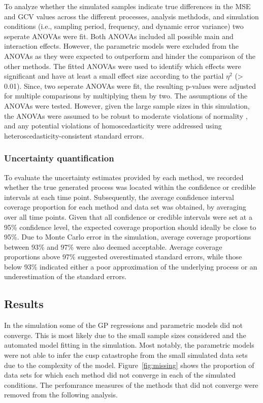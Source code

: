 \documentclass[man, floatsintext]{apa7}
\begin{document}
To analyze whether the simulated samples indicate true differences in the
MSE and GCV values across the different processes, analysis methdods, and
simulation conditions (i.e., sampling period, frequency, and dynamic error
variance) two seperate ANOVAs were fit. Both ANOVAs included all possible main
and interaction effects. However, the parametric models were excluded from
the ANOVAs as they were expected to outperform and hinder the comparison
of the other methods. The fitted ANOVAs were used to identify which effects
were significant and have at least a small effect size according to the partial
$\eta^2$ (> 0.01). Since, two seperate ANOVAs were fit, the resulting p-values
were adjusted for multiple comparisons by multiplying them by two. The
assumptions of the ANOVAs were tested. However, given the large sample sizes in
this simulation, the ANOVAs were assumed to be robust to moderate violations of
normality \parencite{blanca_non-normal_2017}, and any potential violations of
homoscedasticity were addressed using heteroscedasticity-consistent standard
errors.

\subsubsection{Uncertainty quantification}

To evaluate the uncertainty estimates provided by each method, we recorded
whether the true generated process was located within the confidence or
credible intervals at each time point. Subsequently, the average confidence
interval coverage proportion for each method and data set was obtained, by
averaging over all time points. Given that all confidence or credible intervals
were set at a 95\% confidence level, the expected coverage proportion should
ideally be close to 95\%. Due to Monte Carlo error in the simulation, average
coverage proportions between 93\% and 97\% were also deemed acceptable. Average
coverage proportions above 97\% suggested overestimated standard errors, while
those below 93\% indicated either a poor approximation of the underlying
process or an underestimation of the standard errors.

\subsection{Results}

In the simulation some of the GP regressions and parametric models
did not converge. This is most likely due to the small sample sizes considered
and the automated model fitting in the simulation. Most notably, the parametric
models were not able to infer the cusp catastrophe from the small simulated
data sets due to the complexity of the model. Figure~\ref{fig:missing} shows
the proportion of data sets for which each method did not converge in each
of the simulated conditions. The perfomrance measures of the methods that
did not converge were removed from the following analysis.
\end{document}
